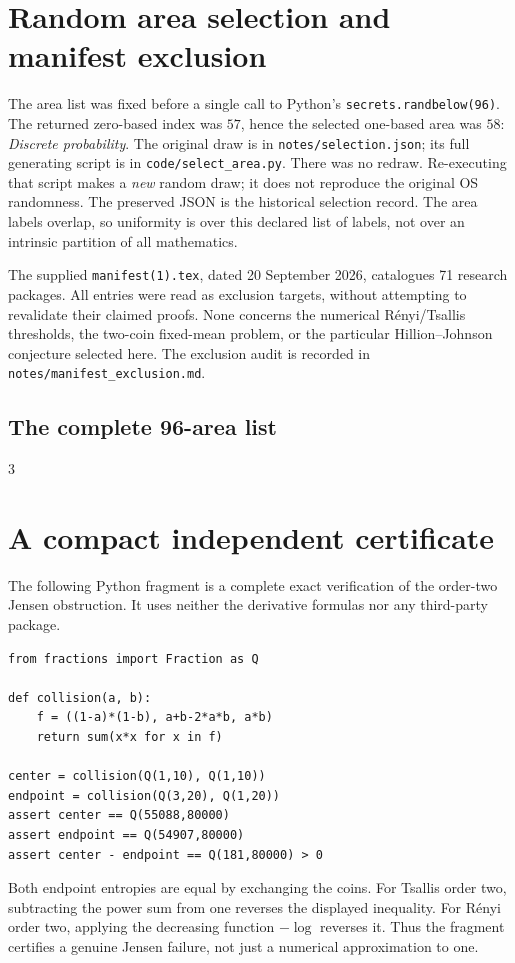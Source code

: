 \documentclass[11pt]{article}
\numberwithin{equation}{section}
\theoremstyle{definition}
\theoremstyle{remark}
\begin{document}
\appendix
\section{Random area selection and manifest exclusion}
The area list was fixed before a single call to Python's
\texttt{secrets.randbelow(96)}. The returned zero-based index was $57$, hence
the selected one-based area was $58$: \emph{Discrete probability}.
The original draw is in \texttt{notes/selection.json}; its full generating
script is in \texttt{code/select\_area.py}. There was no redraw.
Re-executing that script makes a \emph{new} random draw; it does not reproduce
the original OS randomness. The preserved JSON is the historical selection
record. The area labels overlap, so uniformity is over this declared list
of labels, not over an intrinsic partition of all mathematics.

The supplied \texttt{manifest(1).tex}, dated 20 September 2026, catalogues
71 research packages. All entries were read as exclusion targets, without
attempting to revalidate their claimed proofs. None concerns the numerical
R\'enyi/Tsallis thresholds, the two-coin fixed-mean problem, or the particular
Hillion--Johnson conjecture selected here. The exclusion audit is recorded
in \texttt{notes/manifest\_exclusion.md}.

\subsection*{The complete 96-area list}
\begin{multicols}{3}
\small
\begin{enumerate}[leftmargin=2.1em,label=\arabic*.,itemsep=.12em,parsep=0pt]

\end{enumerate}
\end{multicols}

\section{A compact independent certificate}
The following Python fragment is a complete exact verification of the
order-two Jensen obstruction. It uses neither the derivative formulas nor
any third-party package.
\begin{verbatim}
from fractions import Fraction as Q

def collision(a, b):
    f = ((1-a)*(1-b), a+b-2*a*b, a*b)
    return sum(x*x for x in f)

center = collision(Q(1,10), Q(1,10))
endpoint = collision(Q(3,20), Q(1,20))
assert center == Q(55088,80000)
assert endpoint == Q(54907,80000)
assert center - endpoint == Q(181,80000) > 0
\end{verbatim}
Both endpoint entropies are equal by exchanging the coins. For Tsallis
order two, subtracting the power sum from one reverses the displayed
inequality. For R\'enyi order two, applying the decreasing function
$-\log$ reverses it. Thus the fragment certifies a genuine Jensen failure,
not just a numerical approximation to one.
\end{document}
